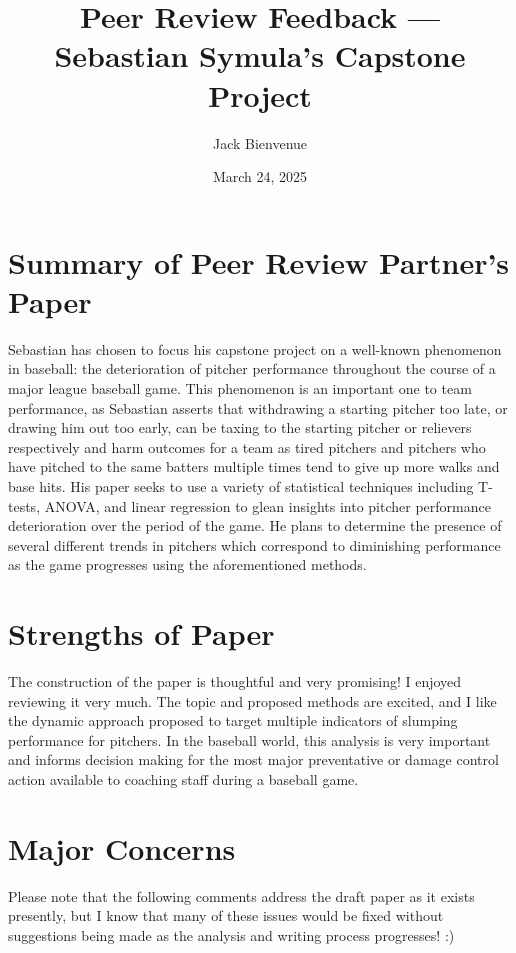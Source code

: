 \documentclass[12pt]{article}
\title{\textbf{Peer Review Feedback --- Sebastian Symula's Capstone Project}}
\author{Jack Bienvenue}
\date{March 24, 2025}
\begin{document}
\maketitle

\section*{Summary of Peer Review Partner's Paper}
Sebastian has chosen to focus his capstone project on a well-known phenomenon in baseball: the deterioration of pitcher performance throughout the course of a major league baseball game. This phenomenon is an important one to team performance, as Sebastian asserts that withdrawing a starting pitcher too late, or drawing him out too early, can be taxing to the starting pitcher or relievers respectively and harm outcomes for a team as tired pitchers and pitchers who have pitched to the same batters multiple times tend to give up more walks and base hits. His paper seeks to use a variety of statistical techniques including T-tests, ANOVA, and linear regression to glean insights into pitcher performance deterioration over the period of the game. He plans to determine the presence of several different trends in pitchers which correspond to diminishing performance as the game progresses using the aforementioned methods.

\section*{Strengths of Paper}

The construction of the paper is thoughtful and very promising! I enjoyed reviewing it very much. The topic and proposed methods are excited, and I like the dynamic approach proposed to target multiple indicators of slumping performance for pitchers. In the baseball world, this analysis is very important and informs decision making for the most major preventative or damage control action available to coaching staff during a baseball game.

\section*{Major Concerns}

Please note that the following comments address the draft paper as it exists presently, but I know that many of these issues would be fixed without suggestions being made as the analysis and writing process progresses! :)
\end{document}
